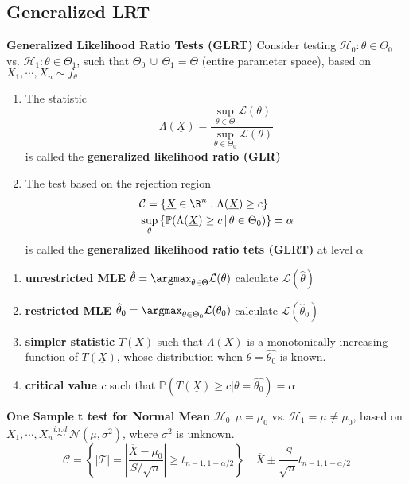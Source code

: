\documentclass[8pt]{article}
\begin{document}
\begin{multicols}{3}
{   \subsection*{Generalized LRT}
   \textbf{Generalized Likelihood Ratio Tests (GLRT)} Consider testing $\mathcal{H}_0: \theta \in\Theta_0$ vs. $\mathcal{H}_1: \theta \in \Theta_1$, such that $\Theta_0 \,\cup\, \Theta_1  = \Theta$ (entire parameter space), based on $X_1, \cdots, X_n \sim f_{\theta}$
   \begin{enumerate}
     \itemsep0em
     \item The statistic
     \[
       \Lambda(\underline{X}) = \frac{ \sup\limits_{\theta\in\Theta} \mathcal{L}(\theta)}{\sup\limits_{\theta\in\Theta_0}\mathcal{L}(\theta)}
     \]
     is called the \textbf{generalized likelihood ratio (GLR)}
     \item The test based on the rejection region
     \begin{align*}
       &\mathcal{C} =  \{ \underline{X}\in\R^n: \Lambda(\underline{X}) \geq c\} \\
       &\sup_{\theta} \left\{ \mathbb{P}(\Lambda(\underline{X}) \geq c\,|\, \theta \in \Theta_0) \right\}= \alpha
     \end{align*}
     is called the \textbf{generalized likelihood ratio tets (GLRT)} at level $\alpha$
   \end{enumerate}
   \begin{enumerate}
     \itemsep0em
     \item \textbf{unrestricted MLE} \quad $\hat{\theta} = \argmax_{\theta \in \Theta} \mathcal{L}(\theta)$ calculate $\mathcal{L}(\hat{\theta})$
     \item \textbf{restricted MLE} \quad $\hat{\theta}_0 = \argmax_{\theta \in \Theta_0} \mathcal{L}(\theta_0)$ calculate $\mathcal{L}(\hat{\theta}_0)$
     \item \textbf{simpler statistic} $T(\underline{X})$ such that $\Lambda(\underline{X})$ is a monotonically increasing function of $T(\underline{X})$, whose distribution when $\theta = \hat{\theta_0}$ is known.
     \item \textbf{critical value $c$} such that $\mathbb{P}(T(\underline{X}) \geq c | \theta = \hat{\theta_0}) = \alpha$
   \end{enumerate}
   \textbf{One Sample t test for Normal Mean} $\mathcal{H}_0: \mu = \mu_0$ vs. $\mathcal{H}_1 = \mu \neq \mu_0$, based on $X_1, \cdots, X_n \stackrel{i.i.d.} {\sim} \mathcal{N}(\mu, \sigma^2)$, where $\sigma^2$ is unknown.
   \[
      \mathcal{C} = \left\{ |\mathcal{T}| = \left| \frac{\overline{X} - \mu_0}{S / \sqrt{n}} \right| \geq t_{n-1, 1-\alpha/2} \right\} \quad \overline{X} \pm \frac{S}{\sqrt{n}}t_{n-1, 1-\alpha/2}
\]}
\end{multicols}
\end{document}
